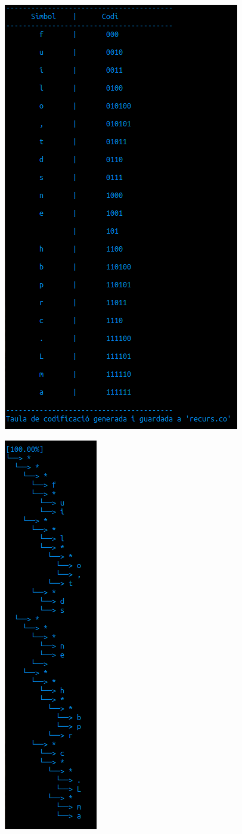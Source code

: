 \documentclass[a4paper,12pt]{article}
\begin{document}
\includegraphics{tabla.png}

\includegraphics{arbol.png}
\end{document}
